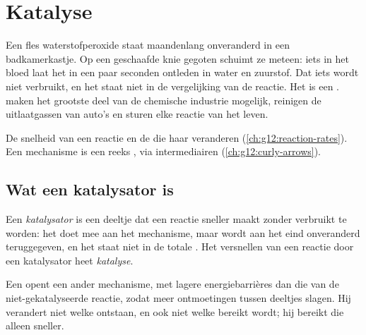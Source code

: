 \chapter{Katalyse}\label{ch:g12:catalysis}

Een fles waterstofperoxide staat maandenlang onveranderd in een
badkamerkastje. Op een geschaafde knie gegoten schuimt ze meteen: iets in
het bloed laat het in een paar seconden ontleden in water en zuurstof.
Dat iets wordt niet verbruikt, en het staat niet in de vergelijking van
de reactie. Het is een .  maken het grootste deel
van de chemische industrie mogelijk, reinigen de uitlaatgassen van auto's
en sturen elke reactie van het leven.

\begin{recall}
De snelheid van een reactie en de  die haar veranderen
(\cref{ch:g12:reaction-rates}). Een mechanisme is een reeks , via intermediairen (\cref{ch:g12:curly-arrows}).
\end{recall}

\section{Wat een katalysator is}

\begin{definition}\label{def:g12:catalysis:catalyst}
Een \emph{katalysator} is een deeltje dat een reactie
sneller maakt zonder verbruikt te worden: het doet mee aan het mechanisme,
maar wordt aan het eind onveranderd teruggegeven, en het staat niet in de
totale . Het versnellen van een reactie door een
katalysator heet \emph{katalyse}.
\end{definition}

\begin{proposition}\label{prop:g12:catalysis:path}
Een  opent een ander mechanisme, met lagere energiebarrières
dan die van de niet-gekatalyseerde reactie, zodat meer ontmoetingen
tussen deeltjes slagen. Hij verandert niet welke 
ontstaan, en ook niet welke  bereikt wordt; hij bereikt die
alleen sneller.
\end{proposition}

